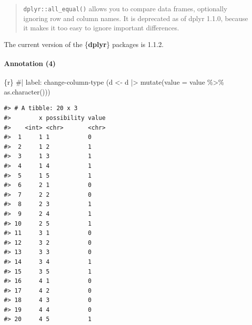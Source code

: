 \documentclass[
  letterpaper,
  DIV=11,
  numbers=noendperiod]{scrreprt}
\let\oldparagraph\paragraph
\renewcommand{\paragraph}[1]{\oldparagraph{#1}\mbox{}}
\newenvironment{Shaded}{\begin{snugshade}}{\end{snugshade}}
\newcommand{\AttributeTok}[1]{\textcolor[rgb]{0.40,0.45,0.13}{#1}}
\newcommand{\CommentTok}[1]{\textcolor[rgb]{0.37,0.37,0.37}{#1}}
\newcommand{\FunctionTok}[1]{\textcolor[rgb]{0.28,0.35,0.67}{#1}}
\newcommand{\InformationTok}[1]{\textcolor[rgb]{0.37,0.37,0.37}{#1}}
\newcommand{\NormalTok}[1]{\textcolor[rgb]{0.00,0.23,0.31}{#1}}
\newcommand{\OtherTok}[1]{\textcolor[rgb]{0.00,0.23,0.31}{#1}}
\newcommand{\SpecialCharTok}[1]{\textcolor[rgb]{0.37,0.37,0.37}{#1}}
\begin{document}
\begin{tcolorbox}[enhanced jigsaw, colframe=quarto-callout-warning-color-frame, colback=white, toprule=.15mm, breakable, arc=.35mm, bottomtitle=1mm, colbacktitle=quarto-callout-warning-color!10!white, toptitle=1mm, titlerule=0mm, title=\textcolor{quarto-callout-warning-color}{\faExclamationTriangle}\hspace{0.5em}{Warning}, leftrule=.75mm, opacityback=0, rightrule=.15mm, opacitybacktitle=0.6, bottomrule=.15mm, left=2mm, coltitle=black]

\begin{quote}
\texttt{dplyr::all\_equal()} allows you to compare data frames,
optionally ignoring row and column names. It is deprecated as of dplyr
1.1.0, because it makes it too easy to ignore important differences.
\end{quote}

The current version of the \{\textbf{dplyr}\} packages is 1.1.2.

\end{tcolorbox}

\hypertarget{annotation-4}{%
\paragraph{Annotation (4)}\label{annotation-4}}

\begin{Shaded}
\begin{Highlighting}[]
\InformationTok{\textasciigrave{}\textasciigrave{}\textasciigrave{}\{r\}}
\CommentTok{\#| label: change{-}column{-}type}
\NormalTok{(d }\OtherTok{\textless{}{-}}\NormalTok{ d }\SpecialCharTok{|\textgreater{}} 
    \FunctionTok{mutate}\NormalTok{(}\AttributeTok{value =}\NormalTok{ value }\SpecialCharTok{\%\textgreater{}\%} \FunctionTok{as.character}\NormalTok{()))}
\InformationTok{\textasciigrave{}\textasciigrave{}\textasciigrave{}}
\end{Highlighting}
\end{Shaded}

\begin{verbatim}
#> # A tibble: 20 x 3
#>        x possibility value
#>    <int> <chr>       <chr>
#>  1     1 1           0    
#>  2     1 2           1    
#>  3     1 3           1    
#>  4     1 4           1    
#>  5     1 5           1    
#>  6     2 1           0    
#>  7     2 2           0    
#>  8     2 3           1    
#>  9     2 4           1    
#> 10     2 5           1    
#> 11     3 1           0    
#> 12     3 2           0    
#> 13     3 3           0    
#> 14     3 4           1    
#> 15     3 5           1    
#> 16     4 1           0    
#> 17     4 2           0    
#> 18     4 3           0    
#> 19     4 4           0    
#> 20     4 5           1
\end{verbatim}
\end{document}
